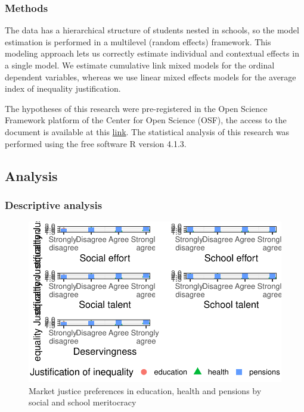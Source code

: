 \documentclass[
  letterpaper,
  DIV=11,
  numbers=noendperiod]{scrartcl}
\begin{document}
\subsubsection{Methods}\label{methods-1}

The data has a hierarchical structure of students nested in schools, so
the model estimation is performed in a multilevel (random effects)
framework. This modeling approach lets us correctly estimate individual
and contextual effects in a single model. We estimate cumulative link
mixed models for the ordinal dependent variables, whereas we use linear
mixed effects models for the average index of inequality justification.

The hypotheses of this research were pre-registered in the Open Science
Framework platform of the Center for Open Science (OSF), the access to
the document is available at this
\href{https://doi.org/10.17605/OSF.IO/UFSDV}{link}. The statistical
analysis of this research was performed using the free software R
version 4.1.3.

\subsection{Analysis}\label{analysis}

\subsubsection{Descriptive analysis}\label{descriptive-analysis}

\begin{figure}[H]

{\centering \includegraphics{paper_files/figure-pdf/unnamed-chunk-11-1.pdf}

}

\caption{Market justice preferences in education, health and pensions by
social and school meritocracy}

\end{figure}%
\end{document}
